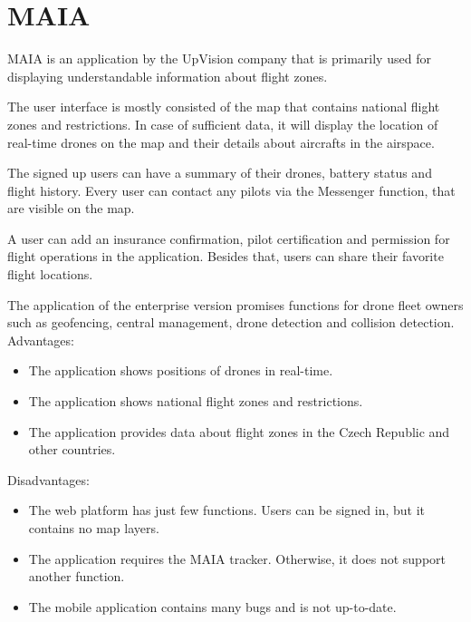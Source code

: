 \section{MAIA}\label{sec:maia}
MAIA is an application by the UpVision company that is primarily used for displaying understandable information about flight zones.~\cite{maia}

The user interface is mostly consisted of the map that contains national flight zones and restrictions.
In case of sufficient data, it will display the location of real-time drones on the map and their details about aircrafts in the airspace.

The signed up users can have a summary of their drones, battery status and flight history.
Every user can contact any pilots via the Messenger function, that are visible on the map.

A user can add an insurance confirmation, pilot certification and permission for flight operations in the application.
Besides that, users can share their favorite flight locations.

The application of the enterprise version promises functions for drone fleet owners such as geofencing, central management, drone detection and collision detection.
\newline
\newline
Advantages:
\begin{itemize}
    \item The application shows positions of drones in real-time.
    \item The application shows national flight zones and restrictions.
    \item The application provides data about flight zones in the Czech Republic and other countries.
\end{itemize}
Disadvantages:
\begin{itemize}
    \item The web platform has just few functions.
    Users can be signed in, but it contains no map layers.
    \item The application requires the MAIA tracker.
    Otherwise, it does not support another function.~\cite{maia}
    \item The mobile application contains many bugs and is not up-to-date.
\end{itemize}